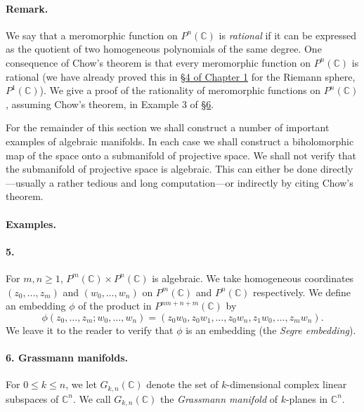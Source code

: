 \paragraph*{Remark.} We say that a meromorphic function on $P^n(\mathbb C)$ is \emph{rational} if it can be expressed as the quotient of two homogeneous polynomials of the same degree. One consequence of Chow's theorem is that every meromorphic function on $P^n(\mathbb C)$ is rational (we have already proved this in \hyperref[sec:1:4]{\S4 of Chapter 1} for the Riemann sphere, $P^1(\mathbb C)$). We give a proof of the rationality of meromorphic functions on $P^n(\mathbb C)$, assuming Chow's theorem, in Example 3 of \hyperref[sec:4:6]{\S6}.

For the remainder of this section we shall construct a number of important examples of algebraic manifolds. In each case we shall construct a biholomorphic map of the space onto a submanifold of projective space. We shall not verify that the submanifold of projective space is algebraic. This can either be done directly---usually a rather tedious and long computation---or indirectly by citing Chow's theorem.

\paragraph*{Examples.}
\paragraph*{5.} For $m,n\geq1$, $P^m(\mathbb C)\times P^n(\mathbb C)$ is algebraic. We take homogeneous coordinates $(z_0,\ldots,z_m)$ and $(w_0,\ldots,w_n)$ on $P^m(\mathbb C)$ and $P^n(\mathbb C)$ respectively. We define an embedding $\phi$ of the product in $P^{nm+n+m}(\mathbb C)$ by
\[
\phi(z_0,\ldots,z_m;w_0,\ldots,w_n)=(z_0w_0,z_0w_1,\ldots,z_0w_n,z_1w_0,\ldots,z_mw_n).
\]
We leave it to the reader to verify that $\phi$ is an embedding (the \emph{Segre embedding}).

\paragraph*{6. Grassmann manifolds.} For $0\leq k\leq n$, we let $G_{k,n}(\mathbb C)$ denote the set of $k$-dimensional complex linear subspaces of $\mathbb C^n$. We call $G_{k,n}(\mathbb C)$ the \emph{Grassmann manifold} of $k$-planes in $\mathbb C^n$.

